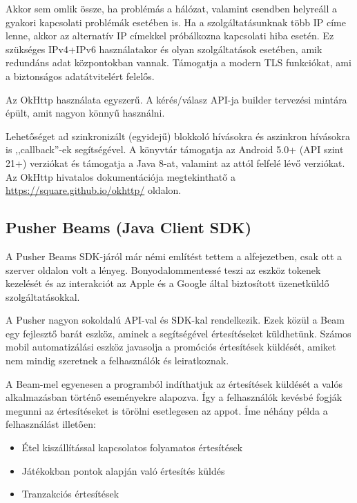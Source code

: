 \documentclass{thesis-ekf}
\theoremstyle{definition}
\theoremstyle{remark}
\begin{document}
Akkor sem omlik össze, ha problémás a hálózat, valamint csendben helyreáll a gyakori kapcsolati problémák esetében is.
Ha a szolgáltatásunknak több IP címe lenne, akkor az alternatív IP címekkel próbálkozna kapcsolati hiba esetén.
Ez szükséges IPv4+IPv6 használatakor és olyan szolgáltatások esetében, amik redundáns adat központokban vannak.
Támogatja a modern TLS funkciókat, ami a biztonságos adatátvitelért felelős.

Az OkHttp használata egyszerű. A kérés/válasz API-ja builder tervezési mintára épült, amit nagyon könnyű használni.

Lehetőséget ad szinkronizált (egyidejű) blokkoló hívásokra és aszinkron hívásokra is ,,callback''-ek segítségével.
A könyvtár támogatja az Android 5.0+ (API szint 21+) verziókat és támogatja a Java 8-at, valamint az attól felfelé lévő verziókat.
Az OkHttp hivatalos dokumentációja megtekinthatő a \url{https://square.github.io/okhttp/} oldalon.

\subsection{Pusher Beams (Java Client SDK)}

A Pusher Beams SDK-járól már némi említést tettem a  alfejezetben, csak ott a szerver oldalon volt a lényeg.
Bonyodalommentessé teszi az eszköz tokenek kezelését és az interakciót az Apple és a Google által biztosított üzenetküldő szolgáltatásokkal.

A Pusher nagyon sokoldalú API-val és SDK-kal rendelkezik. 
Ezek közül a Beam egy fejlesztő barát eszköz, aminek a segítségével értesítéseket küldhetünk.
Számos mobil automatizálási eszköz javasolja a promóciós értesítések küldését, amiket nem mindig szeretnek a felhasználók és leiratkoznak.

A Beam-mel egyenesen a programból indíthatjuk az értesítések küldését a valós alkalmazásban történő eseményekre alapozva. 
Így a felhasználók kevésbé fogják megunni az értesítéseket is törölni esetlegesen az appot. 
Íme néhány példa a felhasználást illetően:

\begin{itemize}
	\item Étel kiszállítással kapcsolatos folyamatos értesítések
	\item Játékokban pontok alapján való értesítés küldés
	\item Tranzakciós értesítések
\end{itemize}
\end{document}
